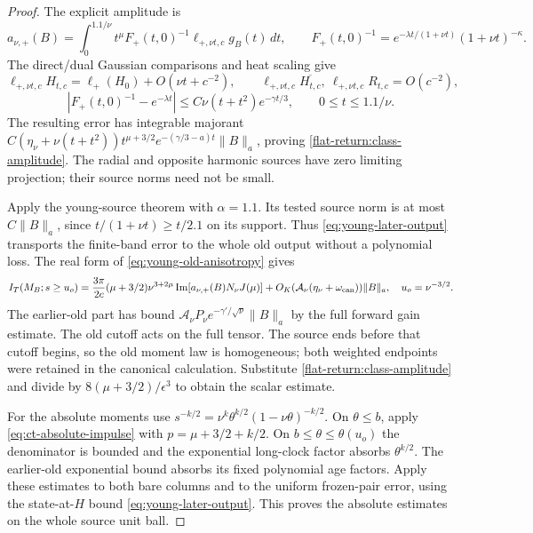 \begin{proof}
The explicit amplitude is
\[
 a_{\nu,+}(B)=\int_0^{1.1/\nu}t^\mu F_+(t,0)^{-1}
                            \ell_{+,\nu t,c}g_B(t)\,dt,
 \qquad F_+(t,0)^{-1}=e^{-\lambda t/(1+\nu t)}(1+\nu t)^{-\kappa}.
\]
The direct/dual Gaussian comparisons and heat scaling give
\[
 \ell_{+,\nu t,c}H_{t,c}=\ell_+(H_0)+O(\nu t+c^{-2}),\qquad
 \ell_{+,\nu t,c}\overline{H_{t,c}},\ \ell_{+,\nu t,c}R_{t,c}=O(c^{-2}),
\]
\[
 |F_+(t,0)^{-1}-e^{-\lambda t}|
       \le C\nu(t+t^2)e^{-\gamma t/3},\qquad 0\le t\le1.1/\nu.
\]
The resulting error has integrable majorant
$C(\eta_\nu+\nu(t+t^2))t^{\mu+3/2}e^{-(\gamma/3-a)t}\|B\|_a$,
proving \eqref{flat-return:class-amplitude}. The radial and opposite
harmonic sources have zero limiting projection; their source norms
need not be small.

Apply the young-source theorem with $\alpha=1.1$. Its tested
source norm is at most $C\|B\|_a$, since
$t/(1+\nu t)\ge t/2.1$ on its support. Thus
\eqref{eq:young-later-output} transports the finite-band error to the
whole old output without a polynomial loss. The real form of
\eqref{eq:young-old-anisotropy} gives
\[
 I_T(M_B; s\ge u_o)=\frac{3\pi}{2c}(\mu+3/2)\nu^{3+2\mu}
      \operatorname{Im}[a_{\nu,+}(B)N_\nu J(\mu)]
      +O_K(\mathcal A_\nu(\eta_\nu+\omega_{\rm can}))\|B\|_a,
 \quad u_o=\nu^{-3/2}.
\]
The earlier-old part has bound
$\mathcal A_\nu P_\nu e^{-\gamma'/\sqrt\nu}\|B\|_a$ by the full
forward gain estimate. The old cutoff acts on the full tensor.
The source ends before that cutoff begins, so the old moment law is
homogeneous; both weighted endpoints were retained in the canonical
calculation. Substitute \eqref{flat-return:class-amplitude} and divide
by $8(\mu+3/2)/\epsilon^3$ to obtain the scalar estimate.

For the absolute moments use
$s^{-k/2}=\nu^k\theta^{k/2}(1-\nu\theta)^{-k/2}$.
On $\theta\le b$, apply \eqref{eq:ct-absolute-impulse} with
$p=\mu+3/2+k/2$. On $b\le\theta\le\theta(u_o)$ the denominator
is bounded and the exponential long-clock factor absorbs
$\theta^{k/2}$. The earlier-old exponential bound absorbs its fixed
polynomial age factors. Apply these estimates to both bare columns
and to the uniform frozen-pair error, using the state-at-$H$ bound
\eqref{eq:young-later-output}. This proves the absolute estimates on
the whole source unit ball.
\end{proof}

